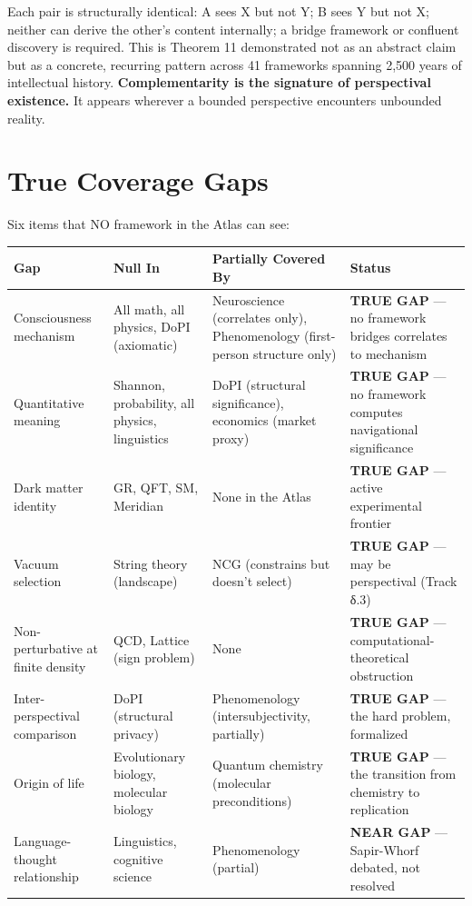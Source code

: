 Each pair is structurally identical: A sees X but not Y; B sees Y but not X; neither can derive the other's content internally; a bridge framework or confluent discovery is required. This is Theorem 11 demonstrated not as an abstract claim but as a concrete, recurring pattern across 41 frameworks spanning 2,500 years of intellectual history. \textbf{Complementarity is the signature of perspectival existence.} It appears wherever a bounded perspective encounters unbounded reality.


\bigskip\noindent\makebox[\textwidth]{\color{rulegray}\rule{5cm}{0.3pt}}\bigskip


\section*{True Coverage Gaps}


Six items that NO framework in the Atlas can see:



\begin{longtable}{p{} p{} p{} p{}}
\toprule
\textbf{Gap} & \textbf{Null In} & \textbf{Partially Covered By} & \textbf{Status} \\
\midrule
\endhead
Consciousness mechanism & All math, all physics, DoPI (axiomatic) & Neuroscience (correlates only), Phenomenology (first-person structure only) & \textbf{TRUE GAP} — no framework bridges correlates to mechanism \\
Quantitative meaning & Shannon, probability, all physics, linguistics & DoPI (structural significance), economics (market proxy) & \textbf{TRUE GAP} — no framework computes navigational significance \\
Dark matter identity & GR, QFT, SM, Meridian & None in the Atlas & \textbf{TRUE GAP} — active experimental frontier \\
Vacuum selection & String theory (landscape) & NCG (constrains but doesn't select) & \textbf{TRUE GAP} — may be perspectival (Track δ.3) \\
Non-perturbative at finite density & QCD, Lattice (sign problem) & None & \textbf{TRUE GAP} — computational-theoretical obstruction \\
Inter-perspectival comparison & DoPI (structural privacy) & Phenomenology (intersubjectivity, partially) & \textbf{TRUE GAP} — the hard problem, formalized \\
Origin of life & Evolutionary biology, molecular biology & Quantum chemistry (molecular preconditions) & \textbf{TRUE GAP} — the transition from chemistry to replication \\
Language-thought relationship & Linguistics, cognitive science & Phenomenology (partial) & \textbf{NEAR GAP} — Sapir-Whorf debated, not resolved \\
\bottomrule
\end{longtable}



